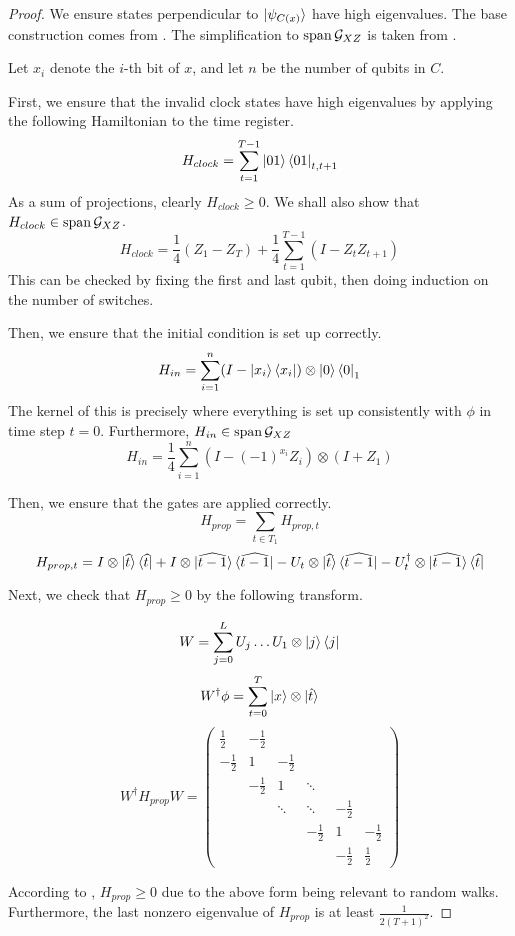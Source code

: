 \begin{proof}
	We ensure states perpendicular to $\ket{\psi_{C(x)}}$ have high eigenvalues. The base construction comes from \cite{kitaev2002classical}. The simplification to $\operatorname*{\operatorname{span}}\mathcal{G}_{XZ}$ is taken from \cite{PhysRevA.78.012352}.

	Let $x_i$ denote the $i$-th bit of $x$, and let $n$ be the number of qubits in $C$.

	First, we ensure that the invalid clock states have high eigenvalues by applying the following Hamiltonian to the time register.
	$$H_{clock}=\sum_{t=1}^{T-1}\ket{01}\bra{01}_{t,t+1}$$
	As a sum of projections, clearly $H_{clock}\geq 0$. We shall also show that $H_{clock}\in\operatorname*{\operatorname{span}}\mathcal{G}_{XZ}$.
	$$H_{clock}=\frac{1}{4}(Z_1 - Z_T) + \frac{1}{4}\sum_{t=1}^{T-1}(I-Z_tZ_{t+1}) $$
	This can be checked by fixing the first and last qubit, then doing induction on the number of switches.

	Then, we ensure that the initial condition is set up correctly.
	$$H_{in}=\sum_{i=1}^n(I-\ket{x_i}\bra{x_i})\otimes\ket{0}\bra{0}_1$$
	The kernel of this is precisely where everything is set up consistently with $\phi$ in time step $t=0$. Furthermore, $H_{in}\in\operatorname*{\operatorname{span}}\mathcal{G}_{XZ}$
	$$H_{in}=\frac{1}{4}\sum_{i=1}^n(I-(-1)^{x_i}Z_i)\otimes(I+Z_1)$$

	Then, we ensure that the gates are applied correctly.
	$$H_{prop}=\sum_{t\in T_1}H_{prop,t}$$
	$$H_{prop,t}=I\otimes\ket{\widehat{t}}\bra{\widehat{t}}
	+I\otimes\ket{\widehat{t-1}}\bra{\widehat{t-1}}
	-U_t\otimes\ket{\widehat{t}}\bra{\widehat{t-1}}
	-U_t^\dagger\otimes\ket{\widehat{t-1}}\bra{\widehat{t}}$$

	Next, we check that $H_{prop}\geq0$ by the following transform.

	$$W=\sum_{j=0}^L U_j\ldots U_1\otimes\ket{j}\bra{j}$$
	$$W^\dagger\phi=\sum_{t=0}^T\ket{x}\otimes\ket{\hat{t}}$$
	$$W^\dagger H_{prop} W=
	\begin{pmatrix}
		\frac{1}{2} & -\frac{1}{2} & & & &  \\
		-\frac{1}{2} & 1 & -\frac{1}{2} & & & \\
		& -\frac{1}{2} & 1 & \ddots & & \\
		& & \ddots & \ddots & -\frac{1}{2} & \\
		& & & -\frac{1}{2} & 1 & -\frac{1}{2} \\
		& & & & -\frac{1}{2} & \frac{1}{2}
	\end{pmatrix}$$

	According to \cite{2002quant.ph.10077A}, $H_{prop}\geq 0$ due to the above form being relevant to random walks. Furthermore, the last nonzero eigenvalue of $H_{prop}$ is at least $\frac{1}{2(T+1)^2}$.


\end{proof}
